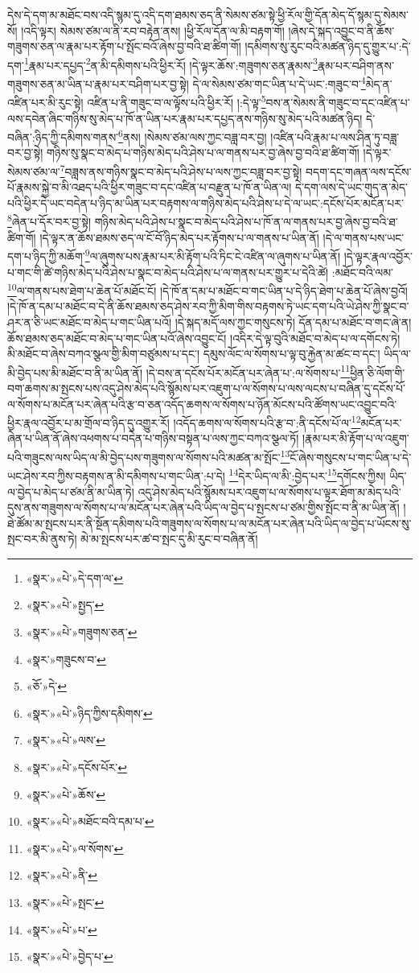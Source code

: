 དེས་དེ་དག་མ་མཐོང་བས་འདི་སྙམ་དུ་འདི་དག་ཐམས་ཅད་ནི་སེམས་ཙམ་སྟེ་ཕྱི་རོལ་གྱི་དོན་མེད་དོ་སྙམ་དུ་སེམས་སོ། །འདི་ལྟར། སེམས་ཙམ་ལ་ནི་རབ་བརྟེན་ནས། །ཕྱི་རོལ་དོན་ལ་མི་བརྟག་གོ། །ཞེས་དེ་སྐད་འབྱུང་བ་ནི་ཆོས་གཟུགས་ཅན་ལ་རྣམ་པར་རྟོག་པ་སྤོང་བའོ་ཞེས་བྱ་བའི་ཐ་ཚིག་གོ། །དམིགས་སུ་རུང་བའི་མཚན་ཉིད་དུ་གྱུར་པ་:དེ་དག་\footnote{«སྣར་»«པེ་»དེ་དག་ལ་}རྣམ་པར་དཔྱད་\footnote{«སྣར་»«པེ་»སྤྱད་}ན་མི་དམིགས་པའི་ཕྱིར་རོ། །དེ་ལྟར་ཆོས་:གཟུགས་ཅན་རྣམས་\footnote{«སྣར་»«པེ་»གཟུགས་ཅན་}རྣམ་པར་བཤིག་ནས་གཟུགས་ཅན་མ་ཡིན་པ་རྣམ་པར་བཤིག་པར་བྱ་སྟེ། དེ་ལ་སེམས་ཙམ་གང་ཡིན་པ་དེ་ཡང་:གཟུང་བ་\footnote{«སྣར་»གཟུངས་བ་}མེད་ན་འཛིན་པར་མི་རུང་སྟེ། འཛིན་པ་ནི་གཟུང་བ་ལ་ལྟོས་པའི་ཕྱིར་རོ། །:དེ་ལྟ་\footnote{«ཅོ་»དེ་}བས་ན་སེམས་ནི་གཟུང་བ་དང་འཛིན་པ་ལས་དབེན་ཞིང་གཉིས་སུ་མེད་པ་ཁོ་ན་ཡིན་པར་རྣམ་པར་དཔྱད་ནས་གཉིས་སུ་མེད་པའི་མཚན་ཉིད། དེ་བཞིན་:ཉིད་ཀྱི་དམིགས་གནས་\footnote{«སྣར་»«པེ་»ཉིད་ཀྱིས་དམིགས་}ནས། །སེམས་ཙམ་ལས་ཀྱང་བཟླ་བར་བྱ། །འཛིན་པའི་རྣམ་པ་ལས་ཤིན་ཏུ་བཟླ་བར་བྱ་སྟེ། གཉིས་སུ་སྣང་བ་མེད་པ་གཉིས་མེད་པའི་ཤེས་པ་ལ་གནས་པར་བྱ་ཞེས་བྱ་བའི་ཐ་ཚིག་གོ། །དེ་ལྟར་སེམས་ཙམ་ལ་\footnote{«སྣར་»«པེ་»ལས་}བཟླས་ནས་གཉིས་སྣང་བ་མེད་པའི་ཤེས་པ་ལས་ཀྱང་བཟླ་བར་བྱ་སྟེ། བདག་དང་གཞན་ལས་དངོས་པོ་རྣམས་སྐྱེ་བ་མི་འཐད་པའི་ཕྱིར་གཟུང་བ་དང་འཛིན་པ་བརྫུན་པ་ཁོ་ན་ཡིན་ལ། དེ་དག་ལས་དེ་ཡང་གུད་ན་མེད་པའི་ཕྱིར་དེ་ཡང་བདེན་པ་ཉིད་མ་ཡིན་པར་བརྟགས་ལ་གཉིས་མེད་པའི་ཤེས་པ་དེ་ལ་ཡང་:དངོས་པོར་མངོན་པར་\footnote{«སྣར་»«པེ་»དངོས་པོར་}ཞེན་པ་དོར་བར་བྱ་སྟེ། གཉིས་མེད་པའི་ཤེས་པ་སྣང་བ་མེད་པའི་ཤེས་པ་ཁོ་ན་ལ་གནས་པར་བྱ་ཞེས་བྱ་བའི་ཐ་ཚིག་གོ། །དེ་ལྟར་ན་ཆོས་ཐམས་ཅད་ལ་ངོ་བོ་ཉིད་མེད་པར་རྟོགས་པ་ལ་གནས་པ་ཡིན་ནོ། །དེ་ལ་གནས་པས་ཡང་དག་པ་ཉིད་ཀྱི་མཆོག་\footnote{«སྣར་»«པེ་»ཆོས་}ལ་ཞུགས་པས་རྣམ་པར་མི་རྟོག་པའི་ཏིང་ངེ་འཛིན་ལ་ཞུགས་པ་ཡིན་ནོ། །དེ་ལྟར་རྣལ་འབྱོར་པ་གང་གི་ཚེ་གཉིས་མེད་པའི་ཤེས་པ་སྣང་བ་མེད་པའི་ཤེས་པ་ལ་གནས་པར་གྱུར་པ་དེའི་ཚེ། :མཐོང་བའི་ལམ་\footnote{«སྣར་»«པེ་»མཐོང་བའི་དམ་པ་}ལ་གནས་པས་ཐེག་པ་ཆེན་པོ་མཐོང་ངོ། །དེ་ཁོ་ན་དམ་པ་མཐོང་བ་གང་ཡིན་པ་དེ་ཉིད་ཐེག་པ་ཆེན་པོ་ཞེས་བྱའོ། །དེ་ཁོ་ན་དམ་པ་མཐོང་བ་དེ་ནི་ཆོས་ཐམས་ཅད་ཤེས་རབ་ཀྱི་མིག་གིས་བརྟགས་ཏེ་ཡང་དག་པའི་ཡེ་ཤེས་ཀྱི་སྣང་བ་ཤར་ན་ཅི་ཡང་མཐོང་བ་མེད་པ་གང་ཡིན་པའོ། །དེ་སྐད་མདོ་ལས་ཀྱང་གསུངས་ཏེ། དོན་དམ་པ་མཐོང་བ་གང་ཞེ་ན། ཆོས་ཐམས་ཅད་མཐོང་བ་མེད་པ་གང་ཡིན་པའོ་ཞེས་འབྱུང་ངོ། །འདིར་དེ་ལྟ་བུའི་མཐོང་བ་མེད་པ་ལ་དགོངས་ཏེ། མི་མཐོང་བ་ཞེས་བཀའ་སྩལ་གྱི་མིག་བཙུམས་པ་དང་། དམུས་ལོང་ལ་སོགས་པ་ལྟ་བུ་རྐྱེན་མ་ཚང་བ་དང་། ཡིད་ལ་མི་བྱེད་པས་མི་མཐོང་བ་ནི་མ་ཡིན་ནོ། །དེ་བས་ན་དངོས་པོར་མངོན་པར་ཞེན་པ་:ལ་སོགས་པ་\footnote{«སྣར་»«པེ་»ལ་སོགས་}ཕྱིན་ཅི་ལོག་གི་བག་ཆགས་མ་སྤངས་པས་འདུ་ཤེས་མེད་པའི་སྙོམས་པར་འཇུག་པ་ལ་སོགས་པ་ལས་ལངས་པ་བཞིན་དུ་དངོས་པོ་ལ་སོགས་པ་མངོན་པར་ཞེན་པའི་རྩ་བ་ཅན་འདོད་ཆགས་ལ་སོགས་པ་ཉོན་མོངས་པའི་ཚོགས་ཡང་འབྱུང་བའི་ཕྱིར་རྣལ་འབྱོར་པ་མ་གྲོལ་བ་ཉིད་དུ་འགྱུར་རོ། །འདོད་ཆགས་ལ་སོགས་པའི་རྩ་བ་:ནི་དངོས་པོ་ལ་\footnote{«སྣར་»«པེ་»ནི་}མངོན་པར་ཞེན་པ་ཡིན་ནོ་ཞེས་འཕགས་པ་བདེན་པ་གཉིས་བསྟན་པ་ལས་ཀྱང་བཀའ་སྩལ་ཏོ། །རྣམ་པར་མི་རྟོག་པ་ལ་འཇུག་པའི་གཟུངས་ལས་ཡིད་ལ་མི་བྱེད་པས་གཟུགས་ལ་སོགས་པའི་མཚན་མ་སྤོང་\footnote{«སྣར་»«པེ་»སྤང་}ངོ་ཞེས་གསུངས་པ་གང་ཡིན་པ་དེ་ཡང་ཤེས་རབ་ཀྱིས་བརྟགས་ན་མི་དམིགས་པ་གང་ཡིན་:པ་དེ། \footnote{«སྣར་»«པེ་»པ་}དེར་ཡིད་ལ་མི་:བྱེད་པར་\footnote{«སྣར་»«པེ་»བྱེད་པ་}དགོངས་ཀྱིས། ཡིད་ལ་བྱེད་པ་མེད་པ་ཙམ་ནི་མ་ཡིན་ཏེ། འདུ་ཤེས་མེད་པའི་སྙོམས་པར་འཇུག་པ་ལ་སོགས་པ་ལྟར་ཐོག་མ་མེད་པའི་དུས་ནས་གཟུགས་ལ་སོགས་པ་ལ་མངོན་པར་ཞེན་པའི་ཡིད་ལ་བྱེད་པ་སྤངས་པ་ཙམ་གྱིས་སྤོང་བ་ནི་མ་ཡིན་ནོ། །ཐེ་ཚོམ་མ་སྤངས་པར་ནི་སྔོན་དམིགས་པའི་གཟུགས་ལ་སོགས་པ་ལ་མངོན་པར་ཞེན་པའི་ཡིད་ལ་བྱེད་པ་ཡོངས་སུ་སྤང་བར་མི་ནུས་ཏེ། མེ་མ་སྤངས་པར་ཚ་བ་སྤང་དུ་མི་རུང་བ་བཞིན་ནོ། 